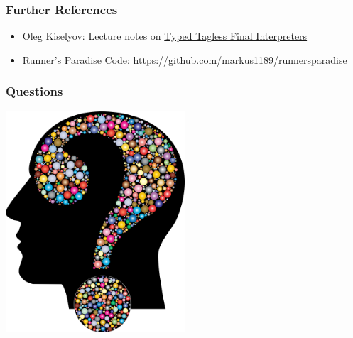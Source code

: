 \documentclass{beamer}
\begin{document}
\begin{frame}
  \frametitle{Further References}
  \begin{itemize}
  \item Oleg Kiselyov: Lecture notes on
    \href{http://okmij.org/ftp/tagless-final/course/lecture.pdf}{Typed
      Tagless Final Interpreters}
  \item Runner's Paradise Code: \url{https://github.com/markus1189/runnersparadise}
  \end{itemize}
\end{frame}

\begin{frame}
  \frametitle{Questions}
  \begin{center}
    \includegraphics[width=0.5\textwidth]{pics/questions.png}
  \end{center}
\end{frame}
\end{document}
